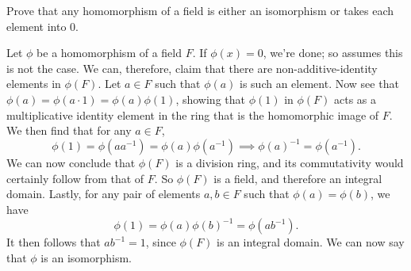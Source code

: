 \documentclass[12pt]{article}
\begin{document}
Prove that any homomorphism of a field is either an isomorphism or takes each element into $0$.

Let $\phi$ be a homomorphism of a field $F$.  If $\phi(x)=0$, we're done; so assumes this is not the case.
We can, therefore, claim that there are non-additive-identity elements in $\phi(F)$.  Let $a\in F$ such
that $\phi(a)$ is such an element.  Now see that $\phi(a)=\phi(a\cdot 1)=\phi(a)\phi(1)$, showing that
$\phi(1)$ in $\phi(F)$ acts as a multiplicative identity element in the ring that is the homomorphic image of $F$.
We then find that for any $a\in F$,
\begin{equation*}
\phi(1)=\phi(aa^{-1})=\phi(a)\phi(a^{-1})\implies\phi(a)^{-1}=\phi(a^{-1}).
\end{equation*}
We can now conclude that $\phi(F)$ is a division ring, and its commutativity would certainly
follow from that of $F$.  So $\phi(F)$ is a field, and therefore an integral domain.
Lastly, for any pair of elements $a,b\in F$ such that $\phi(a)=\phi(b)$,
we have
\begin{equation*}
\phi(1)=\phi(a)\phi(b)^{-1}=\phi(ab^{-1}).
\end{equation*}
It then follows that $ab^{-1}=1$, since $\phi(F)$ is an integral domain.
We can now say that $\phi$ is an isomorphism.
\end{document}
